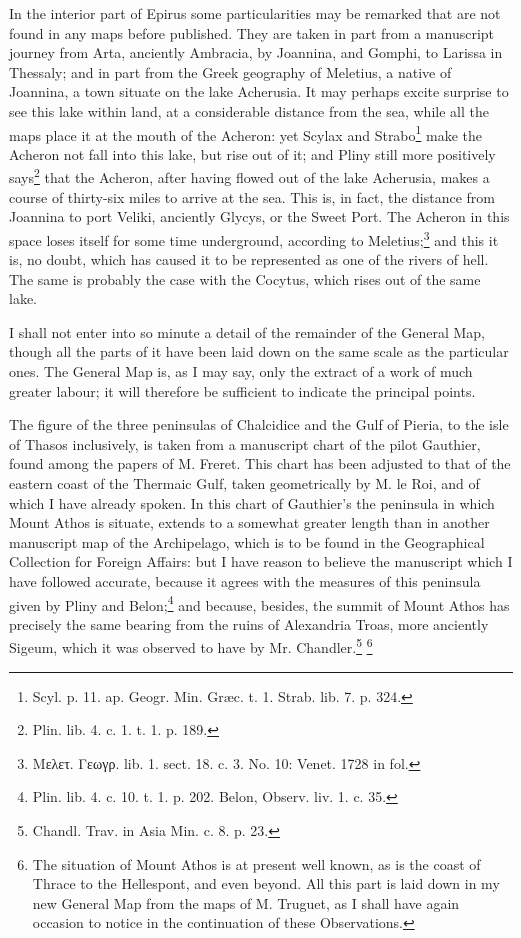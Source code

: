 \documentclass[a4paper, 11pt, oneside, polutonikogreek, english]{article}
\begin{document}
In the interior part of Epirus some particularities may be remarked that are not found in any maps before published. They are taken in part from a manuscript journey from Arta, anciently Ambracia, by Joannina, and Gomphi, to Larissa in Thessaly; and in part from the Greek geography of Meletius, a native of Joannina, a town situate on the lake Acherusia. It may perhaps excite surprise to see this lake within land, at a considerable distance from the sea, while all the maps place it at the mouth of the Acheron: yet Scylax and Strabo\footnote{Scyl. p. 11. ap. Geogr. Min. Græc. t. 1. Strab. lib. 7. p. 324.} make the Acheron not fall into this lake, but rise out of it; and Pliny still more positively says\footnote{Plin. lib. 4. c. 1. t. 1. p. 189.} that the Acheron, after having flowed out of the lake Acherusia, makes a course of thirty-six miles to arrive at the sea. This is, in fact, the distance from Joannina to port Veliki, anciently Glycys, or the Sweet Port. The Acheron in this space loses itself for some time underground, according to Meletius;\footnote{Μελετ. Γεωγρ. lib. 1. sect. 18. c. 3. No. 10: Venet. 1728 in fol.} and this it is, no doubt, which has caused it to be represented as one of the rivers of hell. The same is probably the case with the Cocytus, which rises out of the same lake.

I shall not enter into so minute a detail of the remainder of the General Map, though all the parts of it have been laid down on the same scale as the particular ones. The General Map is, as I may say, only the extract of a work of much greater labour; it will therefore be sufficient to indicate the principal points.

The figure of the three peninsulas of Chalcidice and the Gulf of Pieria, to the isle of Thasos inclusively, is taken from a manuscript chart of the pilot Gauthier, found among the papers of M. Freret. This chart has been adjusted to that of the eastern coast of the Thermaic Gulf, taken geometrically by M. le Roi, and of which I have already spoken. In this chart of Gauthier's the peninsula in which Mount Athos is situate, extends to a somewhat greater length than in another manuscript map of the Archipelago, which is to be found in the Geographical Collection for Foreign Affairs: but I have reason to believe the manuscript which I have followed accurate, because it agrees with the measures of this peninsula given by Pliny and Belon;\footnote{Plin. lib. 4. c. 10. t. 1. p. 202. Belon, Observ. liv. 1. c. 35.} and because, besides, the summit of Mount Athos has precisely the same bearing from the ruins of Alexandria Troas, more anciently Sigeum, which it was observed to have by Mr. Chandler.\footnote{Chandl. Trav. in Asia Min. c. 8. p. 23.} \footnote{The situation of Mount Athos is at present well known, as is the coast of Thrace to the Hellespont, and even beyond. All this part is laid down in my new General Map from the maps of M. Truguet, as I shall have again occasion to notice in the continuation of these Observations.}
\end{document}
